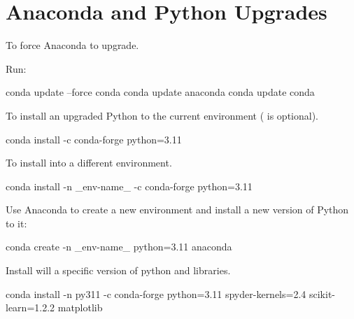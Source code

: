 	\section{Anaconda and Python Upgrades}
	\begin{numberedlist}
		\item To force Anaconda to upgrade.
		\item Run:
		\begin{code}[\codenumbering]{}
			\codeitemnonumber conda update --force conda
			\codeitemnonumber conda update anaconda
			\codeitemnonumber conda update conda
		\end{code}
		\item To install an upgraded Python to the current environment ( is optional).
		\begin{code}[\codenumbering]{}
			\codeitemnonumber conda install -c conda-forge python=3.11
		\end{code}
		\item To install into a different environment.
		\begin{code}[\codenumbering]{}
			\codeitemnonumber conda install -n \_env-name\_ -c conda-forge python=3.11
		\end{code}
		\item \important{[PREFERRED]} Use Anaconda to create a new environment and install a new version of Python to it:
		\begin{code}[\codenumbering]{}
			\codeitemnonumber conda create -n \_env-name\_ python=3.11 anaconda
		\end{code}
		\item Install will a specific version of python and libraries.
		\begin{code}[\codenumbering]{}
			\codeitemnonumber conda install -n py311 -c conda-forge python=3.11 spyder-kernels=2.4 scikit-learn=1.2.2 matplotlib
		\end{code}
	\end{numberedlist}
